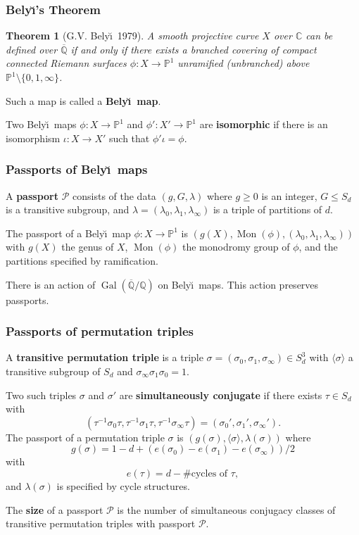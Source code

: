 \documentclass[xcolor=dvipsnames]{beamer}
\DeclareMathOperator{\Gal}{Gal}
\DeclareMathOperator{\Mon}{Mon}
\theoremstyle{plain}
\newtheorem*{thm}{Theorem}
\newcommand{\CC}{\mathbb C}
\newcommand{\PP}{\mathbb P}
\newcommand{\Q}{\mathbb Q}
\newcommand{\Qbar}{\overline{\mathbb Q}}
\newcommand{\defi}[1]{\textbf{#1}} 				%
\newcommand{\Belyi}{Bely\u{\i}}
\begin{document}
  \begin{frame}[plain]
    \frametitle{\Belyi's Theorem}
    \pause
    \begin{thm}[G.V. \Belyi\ 1979]
      A smooth projective curve $X$ over $\CC$
      can be defined over $\overline{\Q}$ if and only if there
      exists a branched covering of compact connected Riemann surfaces $\phi:X\to\PP^1$
      unramified (unbranched) above $\PP^1\setminus\{0,1,\infty\}$.
    \end{thm}
    \pause
    Such a map is called a \textbf{\Belyi\ map}.
    \pause
    \par
    Two \Belyi\ maps $\phi:X\to\PP^1$ and $\phi':X'\to\PP^1$ are
    \defi{isomorphic} if there is an isomorphism $\iota:X\to X'$
    such that $\phi'\iota = \phi$.
  \end{frame}
  \begin{frame}[plain]
    \frametitle{Passports of \Belyi\ maps}
    \pause
    A \textbf{passport} $\mathcal{P}$ consists of the data
    $(g,G,\lambda)$ where $g\geq 0$ is an integer,
    $G\leq S_d$ is a transitive subgroup,
    and $\lambda = (\lambda_0,\lambda_1,\lambda_\infty)$
    is a triple of partitions of $d$.
    \pause
    \par
    The passport of a \Belyi\ map $\phi:X\to\PP^1$
    is $(g(X), \Mon(\phi), (\lambda_0,\lambda_1,\lambda_\infty))$
    with $g(X)$ the genus of $X$,
    $\Mon(\phi)$ the monodromy group of $\phi$,
    and the partitions specified by ramification.
    \pause
    \par
    There is an action of $\Gal(\Qbar/\Q)$ on \Belyi\ maps.
    \pause
    This action preserves passports.
  \end{frame}
  \begin{frame}[plain]
    \frametitle{Passports of permutation triples}
    \pause
    A \textbf{transitive permutation triple} is a triple
    \newline
    $\sigma = (\sigma_0,\sigma_1,\sigma_\infty)\in S_d^3$
    with $\langle\sigma\rangle$ a transitive subgroup of $S_d$
    and $\sigma_\infty\sigma_1\sigma_0 = 1$.
    \pause
    \par
    Two such triples $\sigma$ and $\sigma'$ are
    \textbf{simultaneously conjugate} if there exists
    $\tau\in S_d$ with
    $$
    (\tau^{-1}\sigma_0\tau,\tau^{-1}\sigma_1\tau,\tau^{-1}\sigma_\infty\tau) =
    (\sigma_0',\sigma_1',\sigma_\infty').
    $$
    \pause
    The passport of a permutation triple $\sigma$ is
    $(g(\sigma), \langle\sigma\rangle, \lambda(\sigma))$
    \pause
    where
    $$
    g(\sigma) = 1-d+(e(\sigma_0)-e(\sigma_1)-e(\sigma_\infty))/2
    $$
    \pause
    with
    $$
    e(\tau) = d-\#\text{cycles of }\tau,
    $$
    \pause
    and $\lambda(\sigma)$ is specified by cycle structures.
    \pause
    \par
    The \defi{size} of a passport $\mathcal{P}$ is the number of
    simultaneous conjugacy classes of transitive permutation triples
    with passport $\mathcal{P}$.
  \end{frame}
\end{document}

